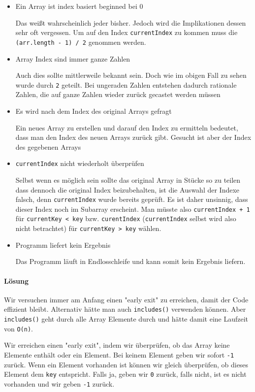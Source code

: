 \documentclass{book}
\begin{document}
\begin{itemize} 
	\item Ein Array ist index basiert beginned bei 0
	
	Das weißt wahrscheinlich jeder bisher. Jedoch wird die Implikationen dessen sehr oft vergessen. Um auf den Index \lstinline|currentIndex| zu kommen muss die \lstinline|(arr.length - 1) / 2| genommen werden.
	\item Array Index sind immer ganze Zahlen
	
	Auch dies sollte mittlerweile bekannt sein. Doch wie im obigen Fall zu sehen wurde durch \lstinline|2| geteilt. Bei ungeraden Zahlen entstehen dadurch rationale Zahlen, die auf ganze Zahlen wieder zurück gecastet werden müssen
	
	\item Es wird nach dem Index des original Arrays gefragt
	
	Ein neues Array zu erstellen und darauf den Index zu ermitteln bedeutet, dass man den Index des neuen Arrays zurück gibt. Gesucht ist aber der Index des gegebenen Arrays
	\item \lstinline|currentIndex| nicht wiederholt überprüfen
	
	Selbst wenn es möglich sein sollte das original Array in Stücke so zu teilen dass dennoch die original Index beizubehalten, ist die Auswahl der Indexe falsch, denn \lstinline|currentIndex| wurde bereits geprüft. Es ist daher unsinnig, dass dieser Index noch im Subarray erscheint. Man müsste also \lstinline|currentIndex + 1| für \lstinline|currentKey < key| bzw. \lstinline|curentIndex| (\lstinline|currentIndex| selbst wird also nicht betrachtet) für \lstinline|currentKey > key| wählen.
	
	\item Programm liefert kein Ergebnis
	
	Das Programm läuft in Endlosschleife und kann somit kein Ergebnis liefern.
	
\end{itemize}
\paragraph{Lösung}
Wir versuchen immer am Anfang einen "early exit" zu erreichen, damit der Code effizient bleibt. Alternativ hätte man auch \lstinline|includes()| verwenden können. Aber \lstinline|includes()| geht durch alle Array Elemente durch und hätte damit eine Laufzeit von \lstinline|O(n)|. 

Wir erreichen einen "early exit", indem wir überprüfen, ob das Array keine Elemente enthält oder ein Element. Bei keinem Element geben wir sofort \lstinline|-1| zurück. Wenn ein Element vorhanden ist können wir gleich überprüfen, ob dieses Element dem \lstinline|key| entspricht. Falls ja, geben wir \lstinline|0| zurück, falls nicht, ist es nicht vorhanden und wir geben \lstinline|-1| zurück.
\end{document}
